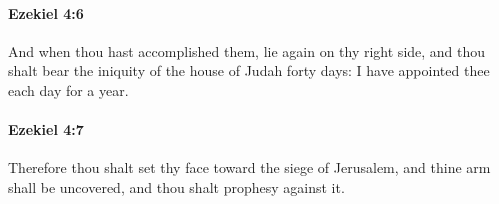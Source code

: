 		\paragraph{Ezekiel 4:6} %
			\label{EZEKIEL-4-6}

			And when thou hast accomplished them, lie again on thy right side, and thou shalt bear the iniquity of the house of Judah forty days: I have appointed thee each day for a year.


		\paragraph{Ezekiel 4:7} %
			\label{EZEKIEL-4-7}

			Therefore thou shalt set thy face toward the siege of Jerusalem, and thine arm shall be uncovered, and thou shalt prophesy against it.


